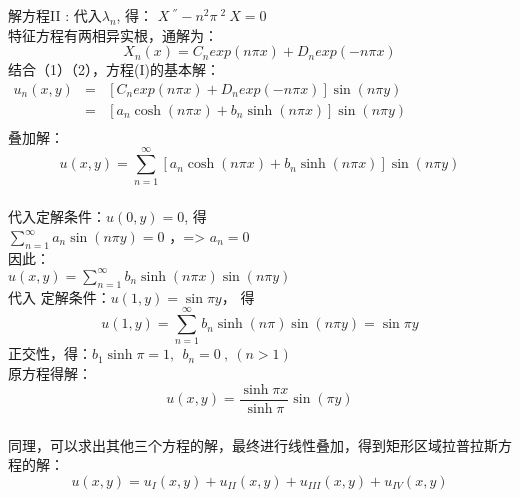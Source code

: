 \begin{frame}
	\frametitle{}	
	解方程II : 
	代入$\lambda_n$, 得：
	$\displaystyle  X~^{''} - n^2\pi~^2~X=0 $ \\
	特征方程有两相异实根，通解为： \\ 
	\begin{equation*}
		X_n(x)=C_n exp(n\pi x )+ D_n exp(-n\pi x )
	\end{equation*}	
	结合（1）（2），方程(I)的基本解：\\ 
	$\displaystyle \begin{array}{llll}
		u_n(x,y) &=& [C_n exp(n\pi x )+ D_n exp(-n\pi x )] \sin (n \pi y)  \\ 
		&=& [a_n \cosh (n\pi x )+ b_n \sinh(n\pi x ) ]\sin (n \pi y)  \\ 
	\end{array}$ \\
	叠加解：
	\begin{equation*}
		u(x, y)   = \sum\limits_{n=1}^{\infty }  [a_n \cosh (n\pi x )+ b_n \sinh (n\pi x ) ] \sin (n \pi y)  
	\end{equation*}	
\end{frame}	

\begin{frame}
	\frametitle{}	
	代入定解条件：$ u(0,y)=0$, 得 \\
	$ \sum\limits_{n=1}^{\infty }  a_n  \sin (n \pi y) =0 $ ，=> $ a_n=0$ \\
	因此：\\
	$	u(x,y)    = \sum\limits_{n=1}^{\infty }  b_n \sinh (n\pi x )  \sin (n \pi y)  $ \\ 
	代入 定解条件：$u(1,y) = \sin \pi y $， 得
	\begin{equation*}
		u(1,y)    = \sum\limits_{n=1}^{\infty }  b_n \sinh (n\pi )  \sin (n \pi y)  = \sin \pi y
	\end{equation*}
	正交性，得：$ b_1\sinh\pi =1,~~ b_n=0~,~ (n>1)$	\\ 
	原方程得解：
	\begin{equation*}
		u(x,y)    = \dfrac{\sinh \pi x}{\sinh \pi}  \sin ( \pi y) 
	\end{equation*}	
\end{frame}	

\begin{frame}
	\frametitle{}	
	同理，可以求出其他三个方程的解，最终进行线性叠加，得到矩形区域拉普拉斯方程的解：
	\begin{equation*}
		u(x,y)    = u_I (x,y)  +   u_{II}(x,y)  + u_{III}(x,y)  + u_{IV}(x,y)  
	\end{equation*}	
\end{frame}	

